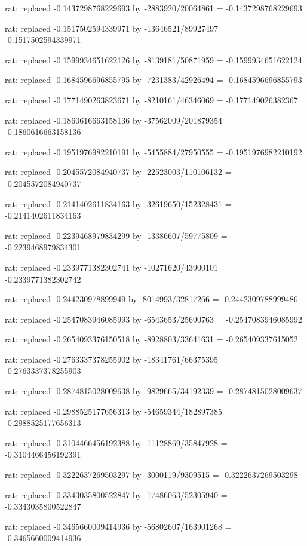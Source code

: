 \documentclass[a4paper,10pt]{article}
\begin{document}
\begin{eulernotebook}
\begin{eulercomment}
\begin{eulercomment}
\begin{eulercomment}
\begin{eulercomment}
\begin{eulercomment}
\begin{eulercomment}
\begin{eulercomment}
\begin{eulercomment}
\begin{eulercomment}
\begin{eulercomment}
\begin{eulercomment}
\begin{eulercomment}
\begin{eulercomment}
\begin{eulercomment}
\begin{eulercomment}
\begin{eulercomment}
\begin{euleroutput}
  rat: replaced -0.1437298768229693 by -2883920/20064861 = -0.1437298768229693
  
  rat: replaced -0.1517502594339971 by -13646521/89927497 = -0.1517502594339971
  
  rat: replaced -0.1599934651622126 by -8139181/50871959 = -0.1599934651622124
  
  rat: replaced -0.1684596696855795 by -7231383/42926494 = -0.1684596696855793
  
  rat: replaced -0.1771490263823671 by -8210161/46346069 = -0.177149026382367
  
  rat: replaced -0.1860616663158136 by -37562009/201879354 = -0.1860616663158136
  
  rat: replaced -0.1951976982210191 by -5455884/27950555 = -0.1951976982210192
  
  rat: replaced -0.2045572084940737 by -22523003/110106132 = -0.2045572084940737
  
  rat: replaced -0.2141402611834163 by -32619650/152328431 = -0.2141402611834163
  
  rat: replaced -0.2239468979834299 by -13386607/59775809 = -0.2239468979834301
  
  rat: replaced -0.2339771382302741 by -10271620/43900101 = -0.2339771382302742
  
  rat: replaced -0.244230978899949 by -8014993/32817266 = -0.2442309788999486
  
  rat: replaced -0.2547083946085993 by -6543653/25690763 = -0.2547083946085992
  
  rat: replaced -0.2654093376150518 by -8928803/33641631 = -0.265409337615052
  
  rat: replaced -0.2763337378255902 by -18341761/66375395 = -0.2763337378255903
  
  rat: replaced -0.2874815028009638 by -9829665/34192339 = -0.2874815028009637
  
  rat: replaced -0.2988525177656313 by -54659344/182897385 = -0.2988525177656313
  
  rat: replaced -0.3104466456192388 by -11128869/35847928 = -0.3104466456192391
  
  rat: replaced -0.3222637269503297 by -3000119/9309515 = -0.3222637269503298
  
  rat: replaced -0.3343035800522847 by -17486063/52305940 = -0.3343035800522847
  
  rat: replaced -0.3465660009414936 by -56802607/163901268 = -0.3465660009414936
  

\end{euleroutput}
\end{eulercomment}
\end{eulercomment}
\end{eulercomment}
\end{eulercomment}
\end{eulercomment}
\end{eulercomment}
\end{eulercomment}
\end{eulercomment}
\end{eulercomment}
\end{eulercomment}
\end{eulercomment}
\end{eulercomment}
\end{eulercomment}
\end{eulercomment}
\end{eulercomment}
\end{eulercomment}
\end{eulernotebook}
\end{document}
